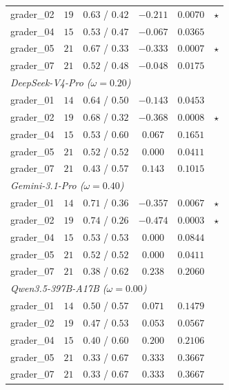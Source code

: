 \begin{table}[p]
\begin{tabular*}{\textwidth}{@{\extracolsep{\fill}}lccccc@{}}
\quad grader\_02 & $19$ & $0.63$ / $0.42$ & $-0.211$ & $0.0070$ & $\star$ \\
\quad grader\_04 & $15$ & $0.53$ / $0.47$ & $-0.067$ & $0.0365$ &  \\
\quad grader\_05 & $21$ & $0.67$ / $0.33$ & $-0.333$ & $0.0007$ & $\star$ \\
\quad grader\_07 & $21$ & $0.52$ / $0.48$ & $-0.048$ & $0.0175$ &  \\
\multicolumn{6}{l}{\textit{DeepSeek-V4-Pro ($\omega=0.20$)}} \\
\quad grader\_01 & $14$ & $0.64$ / $0.50$ & $-0.143$ & $0.0453$ &  \\
\quad grader\_02 & $19$ & $0.68$ / $0.32$ & $-0.368$ & $0.0008$ & $\star$ \\
\quad grader\_04 & $15$ & $0.53$ / $0.60$ & $0.067$ & $0.1651$ &  \\
\quad grader\_05 & $21$ & $0.52$ / $0.52$ & $0.000$ & $0.0411$ &  \\
\quad grader\_07 & $21$ & $0.43$ / $0.57$ & $0.143$ & $0.1015$ &  \\
\multicolumn{6}{l}{\textit{Gemini-3.1-Pro ($\omega=0.40$)}} \\
\quad grader\_01 & $14$ & $0.71$ / $0.36$ & $-0.357$ & $0.0067$ & $\star$ \\
\quad grader\_02 & $19$ & $0.74$ / $0.26$ & $-0.474$ & $0.0003$ & $\star$ \\
\quad grader\_04 & $15$ & $0.53$ / $0.53$ & $0.000$ & $0.0844$ &  \\
\quad grader\_05 & $21$ & $0.52$ / $0.52$ & $0.000$ & $0.0411$ &  \\
\quad grader\_07 & $21$ & $0.38$ / $0.62$ & $0.238$ & $0.2060$ &  \\
\multicolumn{6}{l}{\textit{Qwen3.5-397B-A17B ($\omega=0.00$)}} \\
\quad grader\_01 & $14$ & $0.50$ / $0.57$ & $0.071$ & $0.1479$ &  \\
\quad grader\_02 & $19$ & $0.47$ / $0.53$ & $0.053$ & $0.0567$ &  \\
\quad grader\_04 & $15$ & $0.40$ / $0.60$ & $0.200$ & $0.2106$ &  \\
\quad grader\_05 & $21$ & $0.33$ / $0.67$ & $0.333$ & $0.3667$ &  \\
\quad grader\_07 & $21$ & $0.33$ / $0.67$ & $0.333$ & $0.3667$ &  \\
\bottomrule
\end{tabular*}
\end{table}
